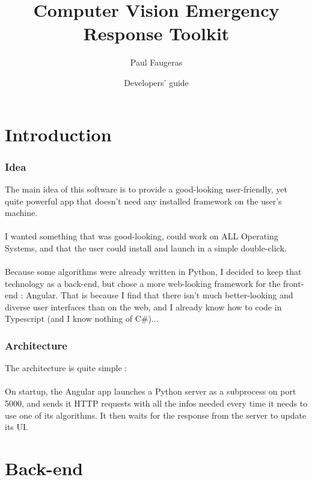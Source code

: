 \documentclass[12pt,a4paper]{article}
\author{Paul Faugeras}
\date{Developers' guide}
\title{Computer Vision Emergency Response Toolkit}
\begin{document}
\pagebreak

\begin{LARGE}
	\maketitle
\end{LARGE}

\pagebreak

\tableofcontents

\pagebreak

\part{Introduction}
\setcounter{section}{0}

\section{Idea}

The main idea of this software is to provide a good-looking user-friendly, yet quite powerful app that doesn't need any installed framework on the user's machine.\\
~\\
I wanted something that was good-looking, could work on ALL Operating Systems, and that the user could install and launch in a simple double-click.\\
~\\
Because some algorithms were already written in Python, I decided to keep that technology as a back-end, but chose a more web-looking framework for the front-end : Angular. That is because I find that there isn't much better-looking and diverse user interfaces than on the web, and I already know how to code in Typescript (and I know nothing of C\#)...

\section{Architecture}
The architecture is quite simple :\\
~\\
On startup, the Angular app launches a Python server as a subprocess on port 5000, and sends it HTTP requests with all the infos needed every time it needs to use one of its algorithms. It then waits for the response from the server to update its UI.

\pagebreak

\part{Back-end}
\setcounter{section}{0}
\end{document}
